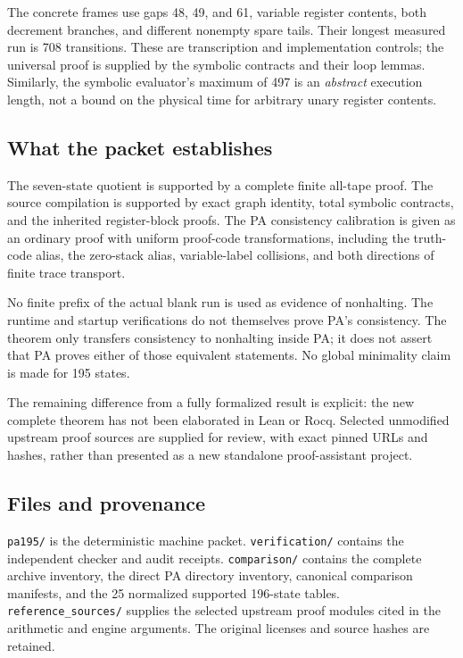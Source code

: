 \documentclass[11pt,letterpaper]{article}
\newcommand{\file}[1]{\texttt{\nolinkurl{#1}}}
\begin{document}
The concrete frames use gaps 48, 49, and 61, variable register
contents, both decrement branches, and different nonempty spare tails.
Their longest measured run is 708 transitions. These are transcription
and implementation controls; the universal proof is supplied by the
symbolic contracts and their loop lemmas. Similarly, the symbolic
evaluator's maximum of 497 is an \emph{abstract} execution length, not
a bound on the physical time for arbitrary unary register contents.

\subsection{What the packet establishes}
The seven-state quotient is supported by a complete finite all-tape
proof. The source compilation is supported by exact graph identity,
total symbolic contracts, and the inherited register-block proofs.
The PA consistency calibration is given as an ordinary proof with
uniform proof-code transformations, including the truth-code alias,
the zero-stack alias, variable-label collisions, and both directions
of finite trace transport.

No finite prefix of the actual blank run is used as evidence of
nonhalting. The runtime and startup verifications do not themselves
prove PA's consistency. The theorem only transfers consistency to
nonhalting inside PA; it does not assert that PA proves either of
those equivalent statements. No global minimality claim is made for
195 states.

The remaining difference from a fully formalized result is explicit:
the new complete theorem has not been elaborated in Lean or Rocq.
Selected unmodified upstream proof sources are supplied for review,
with exact pinned URLs and hashes, rather than presented as a new
standalone proof-assistant project.

\subsection{Files and provenance}
\file{pa195/} is the deterministic machine packet.
\file{verification/} contains the independent checker and audit receipts.
\file{comparison/} contains the complete archive inventory, the direct PA
directory inventory, canonical comparison manifests, and the 25 normalized
supported 196-state tables. \file{reference_sources/} supplies the selected
upstream proof modules cited in the arithmetic and engine arguments.
The original licenses and source hashes are retained.
\end{document}
